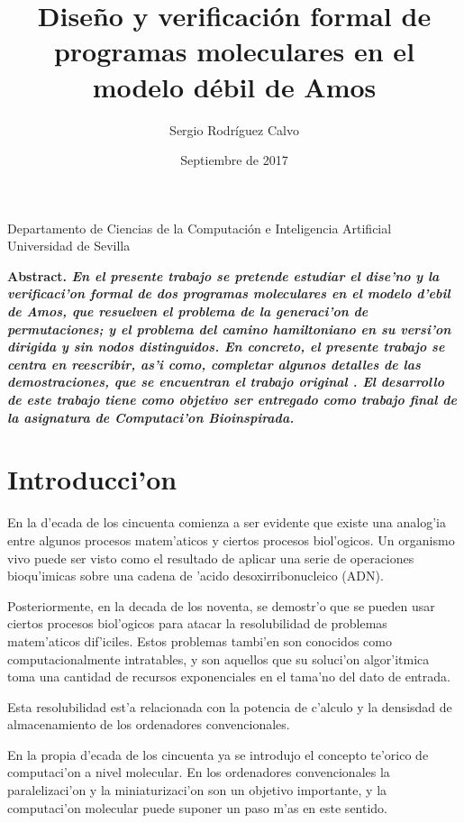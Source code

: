 \documentclass[12pt]{article}
\title{Dise\~no y verificaci\'on formal de programas moleculares en el modelo d\'ebil de Amos}
\author{Sergio Rodr\'iguez Calvo}
\date{Septiembre de 2017}
\begin{document}
    \maketitle
    \thispagestyle{empty}
    \begin{center}
      Departamento de Ciencias de la Computaci\'on e
      Inteligencia Artificial \\
      Universidad de Sevilla
      \end{center}
  \bf{Abstract. }\rm
    \emph{En el presente trabajo se pretende estudiar el dise'no y la verificaci'on formal
    de dos programas moleculares en el modelo d'ebil de Amos, que resuelven el problema de la generaci'on
    de permutaciones; y el problema del camino hamiltoniano en su versi'on dirigida y sin
    nodos distinguidos. En concreto, el presente trabajo se centra en reescribir, as'i como, completar algunos detalles
    de las demostraciones, que se encuentran el trabajo original \cite{Mario-deJesus}.
    El desarrollo de este trabajo tiene como objetivo ser entregado como trabajo final de la asignatura de
    Computaci'on Bioinspirada.}

\section{Introducci'on}

En la d'ecada de los cincuenta comienza a ser evidente que existe una analog'ia entre algunos procesos
matem'aticos y ciertos procesos biol'ogicos. Un organismo vivo puede ser visto como el resultado de
aplicar una serie de operaciones bioqu'imicas sobre una cadena de 'acido desoxirribonucleico (ADN).

Posteriormente, en la decada de los noventa, se demostr'o que se pueden usar ciertos procesos biol'ogicos
para atacar la resolubilidad de problemas matem'aticos dif'iciles. Estos problemas tambi'en son conocidos
como computacionalmente intratables, y son aquellos que su soluci'on algor'itmica toma una cantidad de
recursos exponenciales en el tama'no del dato de entrada.

Esta resolubilidad est'a relacionada con la potencia de c'alculo y la densisdad de almacenamiento de los
ordenadores convencionales.

En la propia d'ecada de los cincuenta ya se introdujo el concepto te'orico de computaci'on a nivel molecular.
En los ordenadores convencionales la paralelizaci'on y la miniaturizaci'on son un objetivo importante, y la
computaci'on molecular puede suponer un paso m'as en este sentido.
\end{document}
